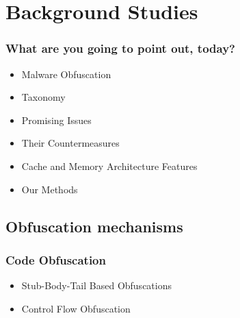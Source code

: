 \documentclass{beamer}
\begin{document}
\section{Background Studies} 

\begin{frame}
	\frametitle{What are you going to point out, today?}
	\begin{itemize}
		\item Malware Obfuscation
		\item Taxonomy
		\item Promising Issues
		\item Their Countermeasures
		\item Cache and Memory Architecture Features
		\item Our Methods
	\end{itemize}
\end{frame}

\subsection{Obfuscation mechanisms}

\begin{frame}
	\frametitle{Code Obfuscation}
	\begin{itemize}
		\LARGE
		\item Stub-Body-Tail Based Obfuscations
		\item Control Flow Obfuscation
	\end{itemize}
\end{frame}
\end{document}
